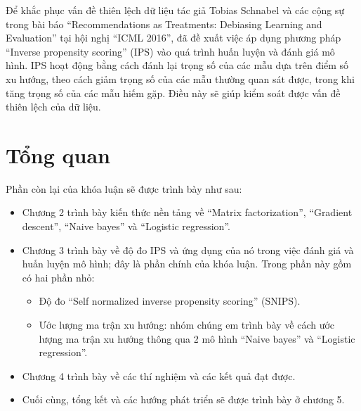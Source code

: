 Để khắc phục vấn đề thiên lệch dữ liệu tác giả Tobias Schnabel và các cộng sự \cite{IPS} trong bài báo ``Recommendations as Treatments: Debiasing Learning and Evaluation'' tại hội nghị ``ICML 2016'', đã đề xuất việc áp dụng phương pháp ``Inverse propensity scoring'' (IPS) vào quá trình huấn luyện và đánh giá mô hình. IPS hoạt động bằng cách đánh lại trọng số của các mẫu dựa trên điểm số xu hướng, theo cách giảm trọng số của các mẫu thường quan sát được, trong khi tăng trọng số của các mẫu hiếm gặp. Điều này sẽ giúp kiểm soát được vấn đề thiên lệch của dữ liệu.

\section{Tổng quan}
Phần còn lại của khóa luận sẽ được trình bày như sau:
\begin{itemize}
    \item Chương 2 trình bày kiến thức nền tảng về ``Matrix factorization'', ``Gradient descent'', ``Naive bayes'' và ``Logistic regression''.
    \item Chương 3 trình bày về độ đo IPS và ứng dụng của nó trong việc đánh giá và huấn luyện mô hình; đây là phần chính của khóa luận. Trong phần này gồm có hai phần nhỏ:
    \begin{itemize}
        \item Độ đo ``Self normalized inverse propensity scoring'' (SNIPS). 
        \item Ước lượng ma trận xu hướng: nhóm chúng em trình bày về cách ước lượng ma trận xu hướng thông qua 2 mô hình ``Naive bayes'' và ``Logistic regression''.
    \end{itemize}
    \item Chương 4 trình bày về các thí nghiệm và các kết quả đạt được.
    \item Cuối cùng, tổng kết và các hướng phát triển sẽ được trình bày ở chương 5.
\end{itemize}
